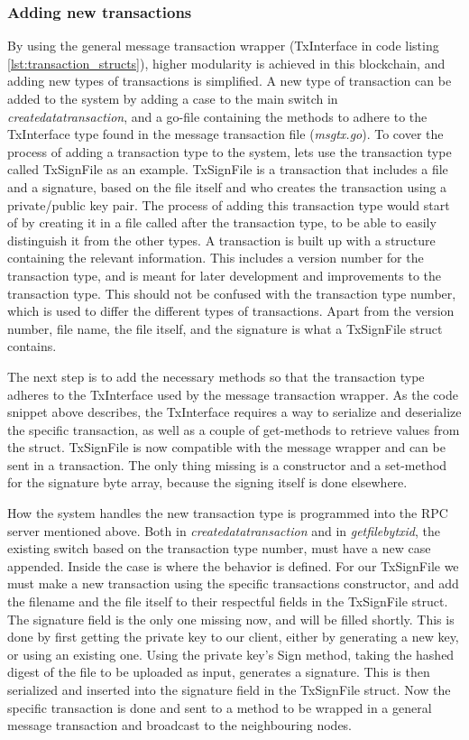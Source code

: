 \documentclass[12pt]{article}
\begin{document}
\subsubsection{Adding new transactions}
By using the general message transaction wrapper (TxInterface in code listing \ref{lst:transaction_structs}), higher modularity is achieved in this blockchain, and adding new types of transactions is simplified. A new type of transaction can be added to the system by adding a case to the main switch in  {\it{createdatatransaction}}, and a go-file containing the methods to adhere to the TxInterface type found in the message transaction file ({\it{msgtx.go}}). To cover the process of adding a transaction type to the system, lets use the transaction type called TxSignFile as an example. TxSignFile is a transaction that includes a file and a signature, based on the file itself and who creates the transaction using a private/public key pair. The process of adding this transaction type would start of by creating it in a file called after the transaction type, to be able to easily distinguish it from the other types. A transaction is built up with a structure containing the relevant information. This includes a version number for the transaction type, and is meant for later development and improvements to the transaction type. This should not be confused with the transaction type number, which is used to differ the different types of transactions. Apart from the version number, file name, the file itself, and the signature is what a TxSignFile struct contains.

The next step is to add the necessary methods so that the transaction type adheres to the TxInterface used by the message transaction wrapper. As the code snippet above describes, the TxInterface requires a way to serialize and deserialize the specific transaction, as well as a couple of get-methods to retrieve values from the struct. TxSignFile is now compatible with the message wrapper and can be sent in a transaction. The only thing missing is a constructor and a set-method for the signature byte array, because the signing itself is done elsewhere. 

How the system handles the new transaction type is programmed into the RPC server mentioned above. Both in \textit{createdatatransaction} and in \textit{getfilebytxid}, the existing switch based on the transaction type number, must have a new case appended. Inside the case is where the behavior is defined. For our TxSignFile we must make a new transaction using the specific transactions constructor, and add the filename and the file itself to their respectful fields in the TxSignFile struct. The signature field is the only one missing now, and will be filled shortly. This is done by first getting the private key to our client, either by generating a new key, or using an existing one. Using the private key's Sign method, taking the hashed digest of the file to be uploaded as input, generates a signature. This is then serialized and inserted into the signature field in the TxSignFile struct. Now the specific transaction is done and sent to a method to be wrapped in a general message transaction and broadcast to the neighbouring nodes. 
\end{document}
